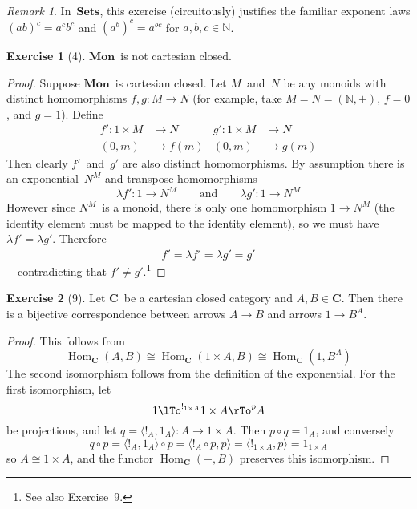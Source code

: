 \documentclass[letterpaper,12pt]{article}
\newcommand{\N}{\mathbb{N}}
\newcommand{\iso}{\cong}
\newcommand{\after}{\circ}
\newcommand{\term}{{!}}
\DeclareMathOperator{\Hom}{Hom}
\newcommand{\pair}[2]{\langle{#1},{#2}\rangle}
\newcommand{\cat}[1]{\mathbf{#1}}
\newcommand{\curry}[1]{\lambda{#1}}
\newcommand{\uncurry}[1]{\overline{#1}}
\newcommand{\C}{\cat{C}}
\newcommand{\Sets}{\cat{Sets}}
\newcommand{\Mon}{\cat{Mon}}
\theoremstyle{definition}
\newtheorem*{exer}{Exercise}
\theoremstyle{remark}
\newtheorem*{rmk}{Remark}
\theoremstyle{direction}
\begin{document}
\begin{rmk}
In~\(\Sets\), this exercise (circuitously) justifies the familiar exponent laws \((ab)^c=a^cb^c\) and \((a^b)^c=a^{bc}\) for \(a,b,c\in\N\).
\end{rmk}

\begin{exer}[4]
\(\Mon\)~is not cartesian closed.
\end{exer}
\begin{proof}
Suppose \(\Mon\)~is cartesian closed. Let \(M\)~and~\(N\) be any monoids with distinct homomorphisms \(f,g:M\to N\) (for example, take \(M=N=(\N,+)\), \(f=0\), and \(g=1\)). Define
\begin{align*}
f':1\times M&\to N&g':1\times M&\to N\\
(0,m)&\mapsto f(m)&(0,m)&\mapsto g(m)
\end{align*}
Then clearly \(f'\)~and~\(g'\) are also distinct homomorphisms. By assumption there is an exponential~\(N^M\) and transpose homomorphisms
\[\curry{f'}:1\to N^M\qquad\text{and}\qquad\curry{g'}:1\to N^M\]
However since \(N^M\)~is a monoid, there is only one homomorphism \(1\to N^M\) (the identity element must be mapped to the identity element), so we must have \(\curry{f'}=\curry{g'}\). Therefore
\[f'=\uncurry{\curry{f'}}=\uncurry{\curry{g'}}=g'\]
---contradicting that \(f'\ne g'\).\footnote{See also Exercise~9.}
\end{proof}

\begin{exer}[9]
Let \(\C\)~be a cartesian closed category and \(A,B\in\C\). Then there is a bijective correspondence between arrows \(A\to B\) and arrows \(1\to B^A\).
\end{exer}
\begin{proof}
This follows from
\[\Hom_{\C}(A,B)\iso\Hom_{\C}(1\times A,B)\iso\Hom_{\C}(1,B^A)\]
The second isomorphism follows from the definition of the exponential. For the first isomorphism, let
\[1\lTo^{\term_{1\times A}}1\times A\rTo^p A\]
be projections, and let \(q=\pair{\term_A}{1_A}:A\to1\times A\). Then \(p\after q=1_A\), and conversely
\[q\after p=\pair{\term_A}{1_A}\after p=\pair{\term_A\after p}{p}=\pair{\term_{1\times A}}{p}=1_{1\times A}\]
so \(A\iso 1\times A\), and the functor \(\Hom_{\C}(-,B)\) preserves this isomorphism.
\end{proof}
\end{document}
